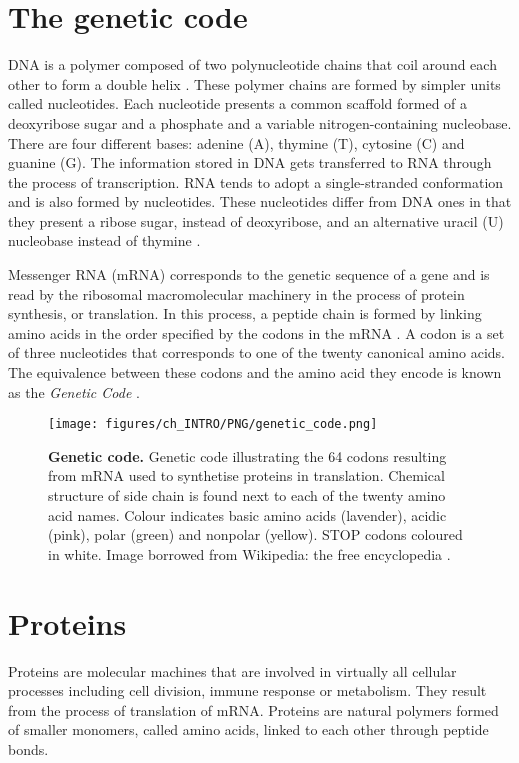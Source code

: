 \section{The genetic code}

DNA is a polymer composed of two polynucleotide chains that coil around each other to form a double helix \cite{WATSON_1953_DNA}. These polymer chains are formed by simpler units called nucleotides. Each nucleotide presents a common scaffold formed of a deoxyribose sugar and a phosphate and a variable nitrogen-containing nucleobase. There are four different bases: adenine (A), thymine (T), cytosine (C) and guanine (G). The information stored in DNA gets transferred to RNA through the process of transcription. RNA tends to adopt a single-stranded conformation and is also formed by nucleotides. These nucleotides differ from DNA ones in that they present a ribose sugar, instead of deoxyribose, and an alternative uracil (U) nucleobase instead of thymine \cite{LEVENE_1909_NUCLEICS}.

Messenger RNA (mRNA) corresponds to the genetic sequence of a gene and is read by the ribosomal macromolecular machinery in the process of protein synthesis, or translation. In this process, a peptide chain is formed by linking amino acids in the order specified by the codons in the mRNA \cite{CRICK_1957_CODE}. A codon is a set of three nucleotides that corresponds to one of the twenty canonical amino acids. The equivalence between these codons and the amino acid they encode is known as the \textit{Genetic Code} \cite{GAMOW_1954_CODE}.

\begin{figure}[htb!]
    \centering
    \texttt{[image: figures/ch\_INTRO/PNG/genetic\_code.png]}
    \caption[Genetic code]{\textbf{Genetic code.} Genetic code illustrating the 64 codons resulting from mRNA used to synthetise proteins in translation. Chemical structure of side chain is found next to each of the twenty amino acid names. Colour indicates basic amino acids (lavender), acidic (pink), polar (green) and nonpolar (yellow). STOP codons coloured in white. Image borrowed from Wikipedia: the free encyclopedia \cite{genetic_code_image}.}
    \label{fig:genetic_code}
\end{figure}

\section{Proteins}

Proteins are molecular machines that are involved in virtually all cellular processes including cell division, immune response or metabolism. They result from the process of translation of mRNA. Proteins are natural polymers formed of smaller monomers, called amino acids, linked to each other through peptide bonds.

